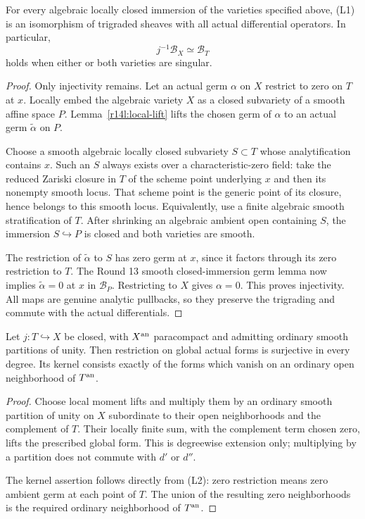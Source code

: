 \begin{theorem}
\label{r14l:germ-iso}
For every algebraic locally closed immersion of the varieties
specified above, (L1) is an isomorphism of trigraded sheaves
with all actual differential operators. In particular,
\[
                          j^{-1}\mathcal B_X\simeq\mathcal B_T
\tag{L2}\label{r14l:germ-isomorphism}
\]
holds when either or both varieties are singular.
\end{theorem}

\begin{proof}
Only injectivity remains. Let an actual germ $\alpha$ on $X$
restrict to zero on $T$ at $x$. Locally embed the algebraic
variety $X$ as a closed subvariety of a smooth affine space $P$.
Lemma~\ref{r14l:local-lift} lifts the chosen germ of $\alpha$
to an actual germ $\widetilde\alpha$ on $P$.

Choose a smooth algebraic locally closed subvariety
$S\subset T$ whose analytification contains $x$. Such an $S$
always exists over a characteristic-zero field: take the reduced
Zariski closure in $T$ of the scheme point underlying $x$ and
then its nonempty smooth locus. That scheme point is the generic
point of its closure, hence belongs to this smooth locus.
Equivalently, use a finite algebraic smooth stratification of $T$.
After shrinking an algebraic ambient open containing $S$, the
immersion $S\hookrightarrow P$ is closed and both varieties
are smooth.

The restriction of $\widetilde\alpha$ to $S$ has zero germ at
$x$, since it factors through its zero restriction to $T$.
The Round 13 smooth closed-immersion germ lemma now implies
$\widetilde\alpha=0$ at $x$ in $\mathcal B_P$.
Restricting to $X$ gives $\alpha=0$. This proves injectivity.
All maps are genuine analytic pullbacks, so they preserve the
trigrading and commute with the actual differentials.
\end{proof}

\begin{corollary}
\label{r14l:global-extension}
Let $j:T\hookrightarrow X$ be closed, with $X^{\rm an}$
paracompact and admitting ordinary smooth partitions of unity.
Then restriction on global actual forms is surjective in every
degree. Its kernel consists exactly of the forms which vanish
on an ordinary open neighborhood of $T^{\rm an}$.
\end{corollary}

\begin{proof}
Choose local moment lifts and multiply them by an ordinary
smooth partition of unity on $X$ subordinate to their open
neighborhoods and the complement of $T$. Their locally finite
sum, with the complement term chosen zero, lifts the prescribed
global form. This is degreewise extension only; multiplying by
a partition does not commute with $d'$ or $d''$.

The kernel assertion follows directly from (L2): zero
restriction means zero ambient germ at each point of $T$.
The union of the resulting zero neighborhoods is the required
ordinary neighborhood of $T^{\rm an}$.
\end{proof}

